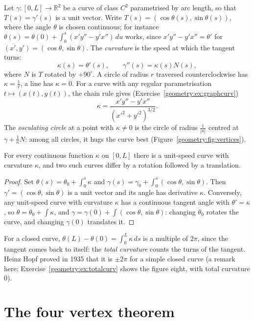 Let $\gamma:[0,L]\to\mathbb R^2$ be a curve of class $C^2$ parametrised by arc length, so that $T(s)=\gamma'(s)$ is a unit vector. Write
$T(s)=(\cos\theta(s),\sin\theta(s))$, where the angle $\theta$ is chosen continuous; for instance $\theta(s)=\theta(0)+\int_0^s(x'y''-y'x'')\,du$ works, since
$x'y''-y'x''=\theta'$ for $(x',y')=(\cos\theta,\sin\theta)$. The \emph{curvature} is the speed at which the tangent turns:
\[
\kappa(s)=\theta'(s),\qquad\gamma''(s)=\kappa(s)N(s),
\]
where $N$ is $T$ rotated by $+90^\circ$. A circle of radius $r$ traversed counterclockwise has $\kappa=\frac1r$, a line has $\kappa=0$. For a curve with any regular
parametrisation $t\mapsto(x(t),y(t))$, the chain rule gives (Exercise~\ref{geometry:ex:graphcurv})
\[
\kappa=\frac{x'y''-y'x''}{(x'^2+y'^2)^{3/2}}.
\]
The \emph{osculating circle} at a point with $\kappa\ne0$ is the circle of radius $\frac1{|\kappa|}$ centred at $\gamma+\frac1\kappa N$: among all circles, it hugs the curve
best (Figure~\ref{geometry:fig:vertices}).

\begin{theorem}\label{geometry:thm:fundcurve}
For every continuous function $\kappa$ on $[0,L]$ there is a unit-speed curve with curvature $\kappa$, and two such curves differ by a rotation followed by a
translation.
\end{theorem}

\begin{proof}
Set $\theta(s)=\theta_0+\int_0^s\kappa$ and $\gamma(s)=\gamma_0+\int_0^s(\cos\theta,\sin\theta)$. Then $\gamma'=(\cos\theta,\sin\theta)$ is a unit vector and its angle
has derivative $\kappa$. Conversely, any unit-speed curve with curvature $\kappa$ has a continuous tangent angle with $\theta'=\kappa$, so $\theta=\theta_0+\int\kappa$, and
$\gamma=\gamma(0)+\int(\cos\theta,\sin\theta)$: changing $\theta_0$ rotates the curve, and changing $\gamma(0)$ translates it.
\end{proof}

For a closed curve, $\theta(L)-\theta(0)=\int_0^L\kappa\,ds$ is a multiple of $2\pi$, since the tangent comes back to itself: the \emph{total curvature} counts the
turns of the tangent. Heinz Hopf proved in 1935 that it is $\pm2\pi$ for a simple closed curve (a remark here; Exercise~\ref{geometry:ex:totalcurv} shows the figure eight,
with total curvature $0$).

\section{The four vertex theorem}

